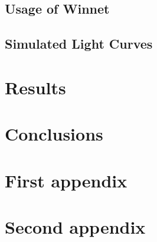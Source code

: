 \documentclass[final]{thesis} %
\begin{document}
\subsection{Usage of Winnet}
\label{sec:winnetmethod}

\subsection{Simulated Light Curves}
\label{sec:slc}

\section{Results}
\label{sec:results}


\section{Conclusions}
\label{sec:conclusions}


\nocite{*}

\printbibliography

\newpage

\appendix

\section{First appendix}
\label{sec:first-appendix}

\lipsum[2-3]

\section{Second appendix}
\label{sec:second-appendix}

\lipsum[2-3]
\end{document}
